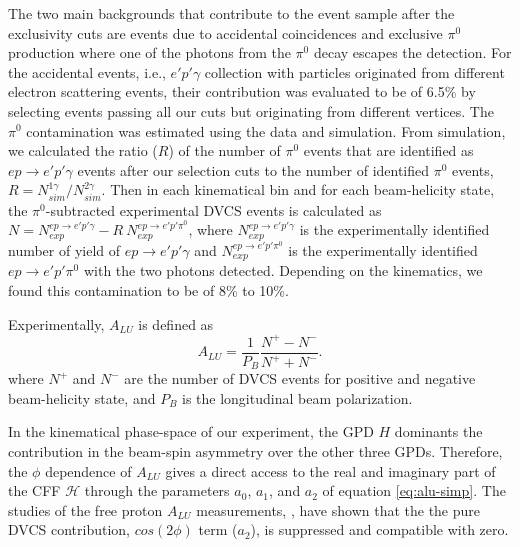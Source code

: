 \documentclass[twocolumn,nofootinbib,showpacs,prl,superscriptaddress,secnumarabic,amssymb,nobibnotes,aps,floatfix]{revtex4}
\begin{document}
The two main backgrounds that contribute to the event sample after the exclusivity cuts are  
events due to accidental coincidences and exclusive $\pi^0$ production where one of the photons 
from the $\pi^0$ decay escapes the detection. For the accidental events, i.e., $e'p'\gamma$ collection 
with particles originated from different electron scattering events, their contribution 
was evaluated to be of 6.5\% by selecting events passing all our cuts but originating from 
different vertices. The $\pi^0$ contamination was estimated using the data and 
simulation. From simulation, we calculated the ratio ($R$) of the number of $\pi^0$ 
events that are identified as $ep\rightarrow e'p'\gamma$ events after our selection 
cuts to the number of identified $\pi^0$ events, 
$R = N^{1\gamma}_{sim}/N^{2\gamma}_{sim}$. Then in each kinematical bin and for 
each beam-helicity state, the $\pi^0$-subtracted experimental DVCS events is 
calculated as $N = N^{ep\rightarrow e'p'\gamma}_{exp}- R~N^{ep\rightarrow 
e'p'\pi^0}_{exp}$, where $N^{ep\rightarrow e'p'\gamma}_{exp}$ is the 
experimentally identified number of yield of $ep\rightarrow e'p'\gamma$ and 
$N^{ep\rightarrow e'p'\pi^0}_{exp}$ is the experimentally identified 
$ep\rightarrow e'p'\pi^0$ with the two photons detected. Depending on the 
kinematics, we found this contamination to be of 8\% to 10\%. 


Experimentally, $A_{LU}$ is defined as
\begin{equation}
A_{LU} = \frac{1}{P_{B}} \frac{N^{+} - N^{-}}{N^{+} + N^{-} }.
\end{equation}
where $N^{+}$ and $N^{-}$ are the number of DVCS events for positive and negative 
beam-helicity state, and $P_{B}$ is the longitudinal beam polarization.  

In the kinematical phase-space of our experiment, the GPD $H$ dominants the 
contribution in the beam-spin asymmetry over the other three GPDs. Therefore, 
the $\phi$ dependence of $A_{LU}$ gives a direct access to the real and 
imaginary part of the CFF $\mathcal{H}$ through the parameters $a_0$, $a_1$, 
and $a_2$ of equation \ref{eq:alu-simp}. The studies of  the free proton 
$A_{LU}$ measurements, \cite{Girod:2007aa}, have shown that the the pure DVCS 
contribution, $cos(2\phi)$ term ($a_2$), is suppressed and compatible with 
zero.  

\end{document}
